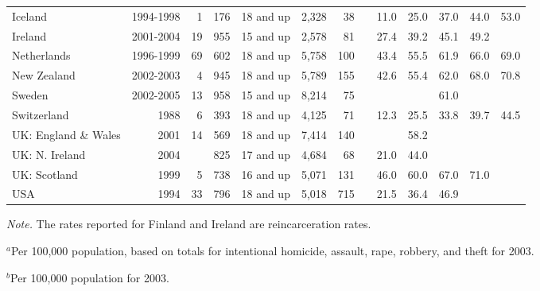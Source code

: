 \begin{table}
\begin{center}
\begin{tabular}{lrr@{,}lrcrrccccc}
  \vspace{0.1cm} Iceland & 1994-1998 &  1 & 176 & 18 and up & 2,328 & 38  & & 11.0 & 25.0 & 37.0 & 44.0 & 53.0 \\
  \vspace{0.1cm} Ireland & 2001-2004 & 19 & 955 & 15 and up & 2,578 & 81  & & 27.4 & 39.2 & 45.1 & 49.2 & \\
  \vspace{0.1cm} Netherlands & 1996-1999 & 69 & 602 & 18 and up & 5,758 & 100 & & 43.4 & 55.5 & 61.9 & 66.0 & 69.0 \\
  \vspace{0.1cm} New Zealand & 2002-2003 & 4 & 945 & 18 and up & 5,789 & 155 & & 42.6 & 55.4 & 62.0 & 68.0 & 70.8 \\
  \vspace{0.1cm} Sweden  & 2002-2005 & 13 & 958 & 15 and up & 8,214 & 75  & & & & 61.0 & & \\
  \vspace{0.1cm} Switzerland & 1988 & 6 & 393 & 18 and up & 4,125 & 71 & & 12.3 & 25.5 & 33.8 & 39.7 & 44.5  \\
  \vspace{0.1cm} UK: England \& Wales & 2001 & 14 & 569 & 18 and up & 7,414 & 140 & & & 58.2 & & & \\
  \vspace{0.1cm} UK: N. Ireland & 2004 & \multicolumn{2}{r}{825} & 17 and up & 4,684 & 68 & & 21.0 & 44.0 & & & \\
  \vspace{0.1cm} UK: Scotland & 1999 & 5 & 738 & 16 and up & 5,071 & 131 & & 46.0 & 60.0 & 67.0 & 71.0 &  \\
  \vspace{0.1cm} USA   & 1994 & 33 & 796 & 18 and up & 5,018 & 715 & & 21.5 & 36.4 & 46.9 & &  \\
  \hline
\end{tabular}
\vspace{0.1cm}


\vspace{0.1cm}

\parbox{19.15cm}{\emph{Note.}  The rates reported for Finland and Ireland are reincarceration rates.}

\parbox{19.15cm}{$^a$Per 100,000 population, based on totals for intentional homicide, assault, rape, robbery, and theft for 2003.}

\parbox{19.15cm}{$^b$Per 100,000 population for 2003.}
\normalsize
\end{center}
\end{table}


